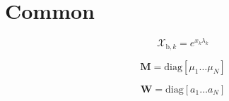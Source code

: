 %
\section{Common}
\label{sec:common}

\begin{equation}
\mathcal{X}_{\mathrm{b},k} = e^{x_{k} \lambda_{k}}
\label{eq:common-mathcal_x}
\end{equation}

\begin{equation}
\mathbf{M} = \mathrm{diag}[\mu_{1} \ldots \mu_{N}]
\label{eq:common-M}
\end{equation}

\begin{equation}
\mathbf{W} = \mathrm{diag}[a_{1} \ldots a_{N}]
\label{eq:common-W}
\end{equation}
